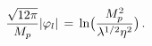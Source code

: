 \begin{equation} \label{phic1}
{{\sqrt{12 \pi}} \over {M_p}} |\varphi_l| \, = \,
{\cal{\ln}}\bigl({{M_p^2} \over {\lambda^{1/2}\eta^2}} \bigr) \, .
\end{equation}

